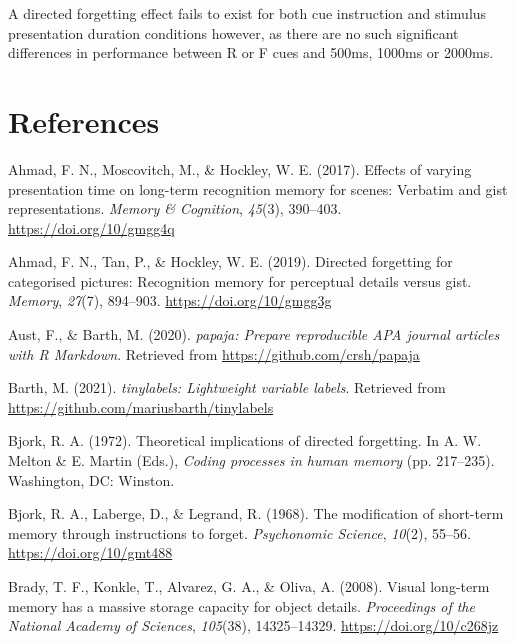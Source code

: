 \documentclass[
  english,
  man,floatsintext]{apa6}
\begin{document}
A directed forgetting effect fails to exist for both cue instruction and stimulus presentation duration conditions however, as there are no such significant differences in performance between R or F cues and 500ms, 1000ms or 2000ms.

\newpage

\hypertarget{references}{%
\section{References}\label{references}}

\begingroup
\setlength{\parindent}{-0.5in}
\setlength{\leftskip}{0.5in}

\hypertarget{refs}{}
\leavevmode\hypertarget{ref-ahmadEffectsVaryingPresentation2017}{}%
Ahmad, F. N., Moscovitch, M., \& Hockley, W. E. (2017). Effects of varying presentation time on long-term recognition memory for scenes: Verbatim and gist representations. \emph{Memory \& Cognition}, \emph{45}(3), 390--403. \url{https://doi.org/10/gmgg4q}

\leavevmode\hypertarget{ref-ahmadDirectedForgettingCategorised2019}{}%
Ahmad, F. N., Tan, P., \& Hockley, W. E. (2019). Directed forgetting for categorised pictures: Recognition memory for perceptual details versus gist. \emph{Memory}, \emph{27}(7), 894--903. \url{https://doi.org/10/gmgg3g}

\leavevmode\hypertarget{ref-R-papaja}{}%
Aust, F., \& Barth, M. (2020). \emph{papaja: Prepare reproducible APA journal articles with R Markdown}. Retrieved from \url{https://github.com/crsh/papaja}

\leavevmode\hypertarget{ref-R-tinylabels}{}%
Barth, M. (2021). \emph{tinylabels: Lightweight variable labels}. Retrieved from \url{https://github.com/mariusbarth/tinylabels}

\leavevmode\hypertarget{ref-bjorkTheoreticalImplicationsDirected1972}{}%
Bjork, R. A. (1972). Theoretical implications of directed forgetting. In A. W. Melton \& E. Martin (Eds.), \emph{Coding processes in human memory} (pp. 217--235). Washington, DC: Winston.

\leavevmode\hypertarget{ref-bjorkModificationShorttermMemory1968}{}%
Bjork, R. A., Laberge, D., \& Legrand, R. (1968). The modification of short-term memory through instructions to forget. \emph{Psychonomic Science}, \emph{10}(2), 55--56. \url{https://doi.org/10/gmt488}

\leavevmode\hypertarget{ref-bradyVisualLongtermMemory2008}{}%
Brady, T. F., Konkle, T., Alvarez, G. A., \& Oliva, A. (2008). Visual long-term memory has a massive storage capacity for object details. \emph{Proceedings of the National Academy of Sciences}, \emph{105}(38), 14325--14329. \url{https://doi.org/10/c268jz}
\end{document}
